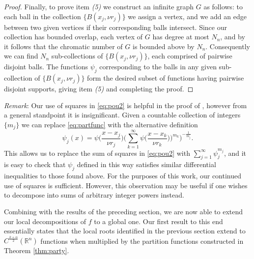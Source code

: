 \documentclass[oneside,hidelinks,indentfirst,10pt]{book}
\begin{document}
\begin{proof}
Finally, to prove item \textit{(5)} we construct an infinite graph \(G\) as follows: to each ball in the collection \(\{B(x_j,\nu r_j)\}\) we assign a vertex, and we add an edge between two given vertices if their corresponding balls intersect. Since our collection has bounded overlap, each vertex of \(G\) has degree at most \(N_n\), and by \cite[Theorem 3]{behzad} it follows that the chromatic number of \(G\) is bounded above by \(N_n\). Consequently we can find \(N_n\) sub-collections of \(\{B(x_j,\nu r_j)\}\), each comprised of pairwise disjoint balls. The functions \(\psi_j\) corresponding to the balls in any given sub-collection of \(\{B(x_j,\nu r_j)\}\) form the desired subset of functions having pairwise disjoint supports, giving item \textit{(5)} and completing the proof.
\end{proof}
 

\textit{Remark}: Our use of squares in \eqref{eq:pou2} is helpful in the proof of , however from a general standpoint it is insignificant. Given a countable collection of integers \(\{m_j\}\) we can replace \eqref{eq:partfunc} with the alternative definition
\[
    \psi_j(x)=\psi\bigg(\frac{x-x_j}{\nu r_j}\bigg)\bigg(\sum_{k=1}^\infty\psi\bigg(\frac{x-x_k}{\nu r_k})\bigg)^{m_k}\bigg)^{-\frac{1}{m_j}}.
\]
This allows us to replace the sum of squares in \eqref{eq:pou2} with \(\sum_{j=1}^\infty\psi_j^{m_j}\), and it is easy to check that \(\psi_j\) defined in this way satisfies similar differential inequalities to those found above. For the purposes of this work, our continued use of squares is sufficient. However, this observation may be useful if one wishes to decompose into sums of arbitrary integer powers instead.


Combining  with the results of the preceding section, we are now able to extend our local decompositions of \(f\) to a global one. Our first result to this end essentially states that the local roots identified in the previous section extend to \(C^{\frac{k+\alpha}{2}}(\mathbb{R}^n)\) functions when multiplied by the partition functions constructed in Theorem \ref{thm:party}.
\end{document}
